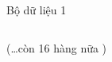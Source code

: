 \documentclass[compress]{beamer}
\begin{document}
\begin{frame}{Bộ dữ liệu 1}
\begin{longtable}{|p{0.2cm}|p{1.0cm}|p{0.55cm}|p{0.85cm}|p{0.6cm}|p{0.7cm}|c|p{0.85cm}|c|p{0.85cm}|}

\end{longtable}
\begin{center}


(\ldots  còn 16 hàng nữa )
\end{center}
\normalsize
\end{frame}
\end{document}
